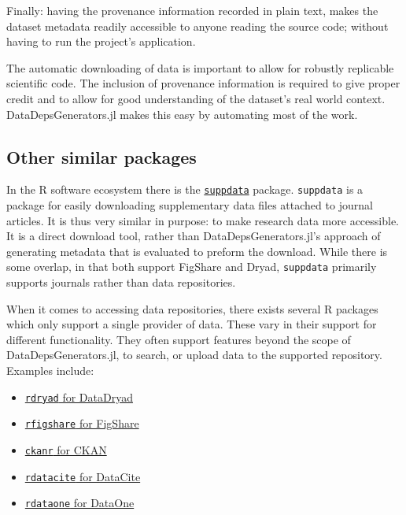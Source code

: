 \documentclass{book}
\begin{document}
Finally: having the provenance information recorded in plain text, makes
the dataset metadata readily accessible to anyone reading the source
code; without having to run the project's application.

The automatic downloading of data is important to allow for robustly
replicable scientific code. The inclusion of provenance information is
required to give proper credit and to allow for good understanding of
the dataset's real world context. DataDepsGenerators.jl makes this easy
by automating most of the work.

\hypertarget{other-similar-packages}{%
	\subsection{Other similar packages}\label{other-similar-packages}}

In the R software ecosystem there is the
\href{https://github.com/ropensci/suppdata}{\texttt{suppdata}}
\citep{suppdata} package. \texttt{suppdata} is a package for easily
downloading supplementary data files attached to journal articles. It is
thus very similar in purpose: to make research data more accessible. It
is a direct download tool, rather than DataDepsGenerators.jl's approach
of generating metadata that is evaluated to preform the download. While
there is some overlap, in that both support FigShare and Dryad,
\texttt{suppdata} primarily supports journals rather than data
repositories.

When it comes to accessing data repositories, there exists several R
packages which only support a single provider of data. These vary in
their support for different functionality. They often support features
beyond the scope of DataDepsGenerators.jl, to search, or upload data to
the supported repository. Examples include:

\begin{itemize}
	\item
	\href{https://github.com/ropensci/rdryad}{\texttt{rdryad} for
		DataDryad}
	\item
	\href{https://github.com/ropensci/rfigshare}{\texttt{rfigshare} for
		FigShare}
	\item
	\href{https://github.com/ropensci/ckanr}{\texttt{ckanr} for CKAN}
	\item
	\href{https://github.com/ropensci/rdatacite}{\texttt{rdatacite} for
		DataCite}
	\item
	\href{https://github.com/DataONEorg/rdataone}{\texttt{rdataone} for
		DataOne}
\end{itemize}
\end{document}
